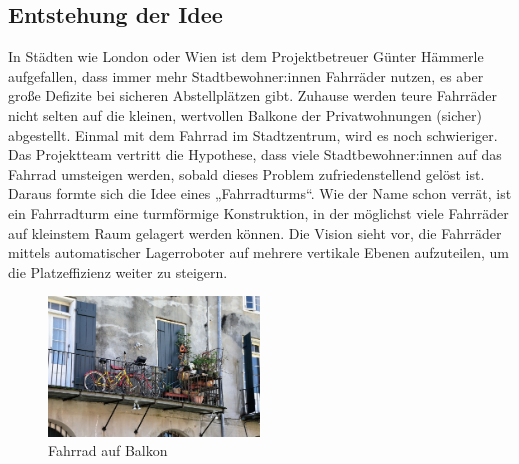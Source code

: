 \subsection{Entstehung der Idee}

In Städten wie London oder Wien ist dem Projektbetreuer Günter Hämmerle aufgefallen, dass immer mehr Stadtbewohner:innen Fahrräder nutzen, es aber große Defizite bei sicheren Abstellplätzen gibt. Zuhause werden teure Fahrräder nicht selten auf die kleinen, wertvollen Balkone der Privatwohnungen (sicher) abgestellt. Einmal mit dem Fahrrad im Stadtzentrum, wird es noch schwieriger. Das Projektteam vertritt die Hypothese, dass viele Stadtbewohner:innen auf das Fahrrad umsteigen werden, sobald dieses Problem zufriedenstellend gelöst ist. Daraus formte sich die Idee eines „Fahrradturms“. Wie der Name schon verrät, ist ein Fahrradturm eine turmförmige Konstruktion, in der möglichst viele Fahrräder auf kleinstem Raum gelagert werden können. Die Vision sieht vor, die Fahrräder mittels automatischer Lagerroboter auf mehrere vertikale Ebenen aufzuteilen, um die Platzeffizienz weiter zu steigern.

\begin{figure}[H]
  \begin{center}
    \includegraphics[width=0.5\textwidth]{images/fahrrad_balkon.jpg}
    \caption{Fahrrad auf Balkon }
    \label{fig:fahrrad_balkon}
  \end{center}
\end{figure}